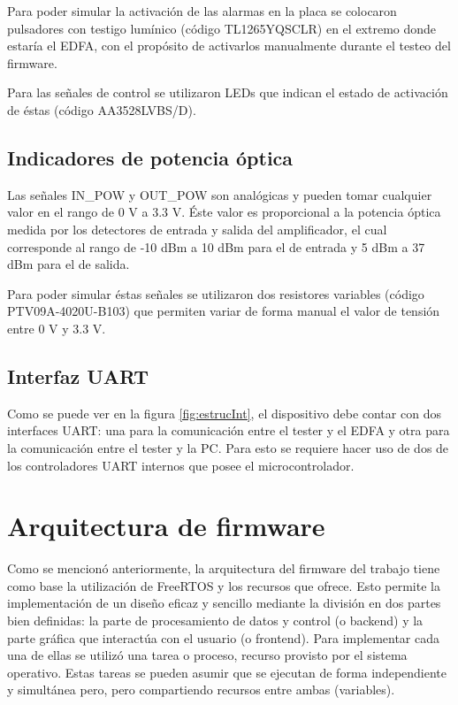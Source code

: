 Para poder simular la activación de las alarmas en la placa se colocaron pulsadores con testigo lumínico (código TL1265YQSCLR) en el extremo donde estaría el EDFA, con el propósito de activarlos manualmente durante el testeo del firmware.

Para las señales de control se utilizaron LEDs que indican el estado de activación de éstas (código AA3528LVBS/D).

\subsection{Indicadores de potencia óptica}

Las señales IN\_POW y OUT\_POW son analógicas y pueden tomar cualquier valor en el rango de 0 V a 3.3 V. Éste valor es proporcional a la potencia óptica medida por los detectores de entrada y salida del amplificador, el cual corresponde al rango de -10 dBm a 10 dBm para el de entrada y 5 dBm a 37 dBm para el de salida.

Para poder simular éstas señales se utilizaron dos resistores variables (código PTV09A-4020U-B103) que permiten variar de forma manual el valor de tensión entre 0 V y 3.3 V.

\subsection{Interfaz UART}

Como se puede ver en la figura \ref{fig:estrucInt}, el dispositivo debe contar con dos interfaces UART: una para la comunicación entre el tester y el EDFA y otra para la comunicación entre el tester y la PC. Para esto se requiere hacer uso de dos de los controladores UART internos que posee el microcontrolador.

\section{Arquitectura de firmware}

Como se mencionó anteriormente, la arquitectura del firmware del trabajo tiene como base la utilización de FreeRTOS y los recursos que ofrece. Esto permite la implementación de un diseño eficaz y sencillo mediante la división en dos partes bien definidas: la parte de procesamiento de datos y control (o backend) y la parte gráfica que interactúa con el usuario (o frontend). Para implementar cada una de ellas se utilizó una tarea o proceso, recurso provisto por el sistema operativo. Estas tareas se pueden asumir que se ejecutan de forma independiente y simultánea pero, pero compartiendo recursos entre ambas (variables).

